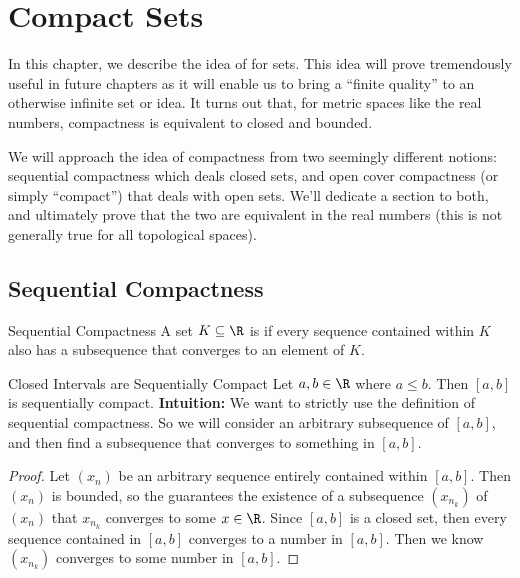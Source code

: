 
\chapter{Compact Sets}

In this chapter, we describe the idea of  for sets. This idea will prove tremendously useful in future chapters as it will enable us to bring a ``finite quality'' to an otherwise infinite set or idea. It turns out that, for metric spaces like the real numbers, compactness is equivalent to closed and bounded.

We will approach the idea of compactness from two seemingly different notions: sequential compactness which deals closed sets, and open cover compactness (or simply ``compact'') that deals with open sets. We'll dedicate a section to both, and ultimately prove that the two are equivalent in the real numbers (this is not generally true for all topological spaces).

\section{Sequential Compactness}
\begin{dfnbox}{Sequential Compactness}{}
    A set $K \subseteq \R$ is  if every sequence contained within $K$ also has a subsequence that converges to an element of $K$.
\end{dfnbox}

\begin{exbox}{Closed Intervals are Sequentially Compact}{}
    Let $a,b \in \R$ where $a \leq b$. Then $[a,b]$ is sequentially compact.
    \tcblower
    \textbf{Intuition:} We want to strictly use the definition of sequential compactness. So we will consider an arbitrary subsequence of $[a,b]$, and then find a subsequence that converges to something in $[a,b]$.
    \begin{proof}
        Let $(x_n)$ be an arbitrary sequence entirely contained within $[a,b]$. Then $(x_n)$ is bounded, so the  guarantees the existence of a subsequence $(x_{n_k})$ of $(x_n)$ that $x_{n_k}$ converges to some $x \in \R$. Since $[a,b]$ is a closed set, then every sequence contained in $[a,b]$ converges to a number in $[a,b]$. Then we know $(x_{n_k})$ converges to some number in $[a,b]$.
    \end{proof}
\end{exbox}

